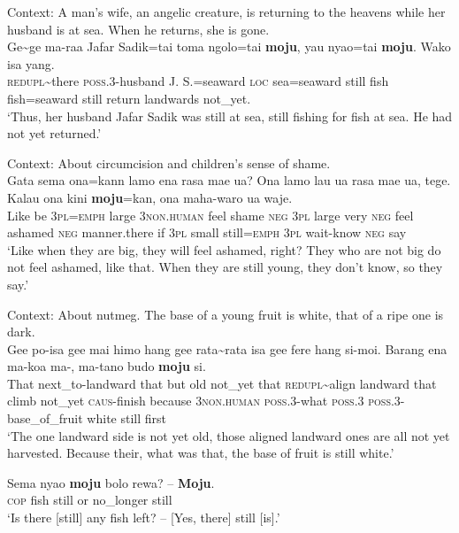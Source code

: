 \begin{exe}
	\ex\label{exAppendixTernate1}
	Context: A man's wife, an angelic creature, is returning to the heavens while her husband is at sea. When he returns, she is gone.\\
	\gll  Ge\sim ge ma-raa Jafar Sadik=tai toma ngolo=tai \textbf{moju}, yau nyao=tai \textbf{moju}. Wako isa yang.\\
	\textsc{redupl}\sim there \textsc{poss}.3-husband J. S.=seaward \textsc{loc} sea=seaward still fish fish=seaward still return landwards not\_yet.\\
	\glt \lq Thus, her husband Jafar Sadik was still at sea, still fishing for fish at sea. He had not yet returned.' \parencite[375]{vanStaden2000}

	\ex\label{exAppendixTernate2}
	 Context: About circumcision and children’s sense of shame.\\
	\gll Gata sema ona=kann lamo ena rasa mae ua? Ona lamo lau ua rasa mae ua, tege. Kalau ona kini \textbf{moju}=kan, ona maha-waro ua waje.\\
	Like be 3\textsc{pl}=\textsc{emph} large 3\textsc{non}.\textsc{human} feel shame \textsc{neg} 3\textsc{pl} large very  \textsc{neg} feel ashamed  \textsc{neg} manner.there if 3\textsc{pl} small still=\textsc{emph} 3\textsc{pl} wait-know \textsc{neg} say\\
	\glt \lq Like when they are big, they will feel ashamed, right? They who are not big do not feel ashamed, like that. When they are still young, they don’t know, so they say.' \parencite[478]{vanStaden2000}

	\ex\label{exAppendixTernate3}
	Context: About nutmeg. The base of a young fruit is white, that of a ripe one is dark.\\
	\gll Gee po-isa gee mai himo hang gee rata\sim rata isa gee fere hang si-moi. Barang ena ma-koa ma-, ma-tano budo \textbf{moju} si.\\
	That next\_to-landward that but old not\_yet that \textsc{redupl}\sim align landward that climb not\_yet \textsc{caus}-finish because 3\textsc{non}.\textsc{human}	\textsc{poss}.3-what \textsc{poss}.3 \textsc{poss}.3-base\_of\_fruit white still first\\
	\glt \lq The one landward side is not yet old, those aligned landward ones are all not yet harvested. Because their, what was that, the base of fruit is still white.' \parencite[257]{Hayami2001}
	
	\ex\label{exAppendixTernate4}
	\gll Sema nyao \textbf{moju} bolo rewa? – \textbf{Moju}.\\
	\textsc{cop} fish still or no\_longer {} still\\
	\glt \lq Is there [still] any fish left? -- [Yes, there] still [is].' \parencite[243]{vanStaden2000}
\end{exe}


